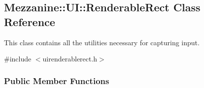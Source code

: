 \hypertarget{structMezzanine_1_1UI_1_1RenderableRect}{
\subsection{Mezzanine::UI::RenderableRect Class Reference}
\label{structMezzanine_1_1UI_1_1RenderableRect}
}


This class contains all the utilities necessary for capturing input.  




{\ttfamily \#include $<$uirenderablerect.h$>$}

\subsubsection*{Public Member Functions}
